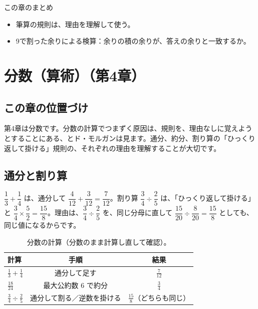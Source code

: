 \documentclass[a4paper,11pt,openany]{ltjsbook}
\begin{document}
\begin{pointbox}{この章のまとめ}
\begin{itemize}[leftmargin=*]
\item 筆算の規則は、理由を理解して使う。
\item 9で割った余りによる検算：余りの積の余りが、答えの余りと一致するか。
\end{itemize}
\end{pointbox}

\chapter{分数（算術）（第4章）}

\section{この章の位置づけ}

第4章は分数です。分数の計算でつまずく原因は、規則を、理由なしに覚えようとすることにある、とド・モルガンは見ます。通分、約分、割り算の「ひっくり返して掛ける」規則の、それぞれの理由を理解することが大切です。

\section{通分と割り算}

$\dfrac13+\dfrac14$ は、通分して $\dfrac4{12}+\dfrac3{12}=\dfrac7{12}$。割り算 $\dfrac34\div\dfrac25$ は、「ひっくり返して掛ける」と $\dfrac34\times\dfrac52=\dfrac{15}8$。理由は、$\dfrac34\div\dfrac25$ を、同じ分母に直して $\dfrac{15}{20}\div\dfrac{8}{20}=\dfrac{15}{8}$ としても、同じ値になるからです。

\begin{table}[htbp]
\centering
\begin{tabular}{lcc}
\toprule
計算 & 手順 & 結果\\
\midrule
$\tfrac13+\tfrac14$ & 通分して足す & $\tfrac7{12}$\\
$\tfrac{18}{24}$ & 最大公約数 $6$ で約分 & $\tfrac34$\\
$\tfrac34\div\tfrac25$ & 通分して割る／逆数を掛ける & $\tfrac{15}8$（どちらも同じ）\\
\bottomrule
\end{tabular}
\caption{分数の計算（分数のまま計算し直して確認）。}
\end{table}
\end{document}
